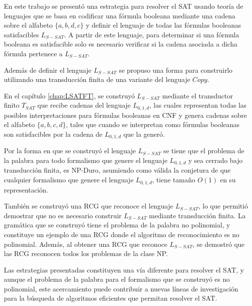 \begin{conclusionsAndRecomendations}

    En este trabajo se presentó una estrategia para resolver el SAT usando teoría de lenguajes que se basa en 
    codificar una fórmula booleana mediante una cadena sobre el alfabeto $\{a,b,d,c\}$ y definir el lenguaje de 
    todas las fórmulas booleanas satisfacibles $L_{S-SAT}$. A partir de este lenguaje, para determinar si una 
    fórmula booleana es satisfacible solo es necesario verificar si la cadena asociada a dicha fórmula pertenece 
    a $L_{S-SAT}$.
    
    Además de definir el lenguaje $L_{S-SAT}$ se propuso una forma para construirlo utilizando una transducción 
    finita de una variante del lenguaje $Copy$. 
    
    En el capítulo \ref{chap:LSATFT}, se construyó $L_{S-SAT}$ mediante el transductor finito $T_{SAT}$ que 
    recibe cadenas del lenguaje $L_{0,1,d}$, las cuales representan todas las posibles interpretaciones para 
    fórmulas booleanas en CNF y genera cadenas sobre el alfabeto $\{a,b,c,d\}$, tales que cuando se interpretan 
    como fórmulas booleanas son satisfacibles por la cadena de $L_{0,1,d}$ que la generó. 
    
    Por la forma en que se construyó el lenguaje $L_{S-SAT}$ se tiene que el problema de la palabra para todo 
    formalismo que genere el lenguaje $L_{0,1,d}$ y sea cerrado bajo transducción finita, es NP-Duro, asumiendo como válida 
    la conjetura de que cualquier formalismo que genere el lenguaje $L_{0,1,d}$, tiene tamaño $O(1)$ en su 
    representación.
    
    También se construyó una RCG que reconoce el lenguaje $L_{S-SAT}$, lo que permitió demostrar que no es 
    necesario construir $L_{S-SAT}$ mediante transducción finita. La gramática que se construyó tiene el 
    problema de la palabra no polinomial, y constituye un ejemplo de una RCG donde el algoritmo de reconocimiento 
    es no polinomial.  Además, al obtener una RCG que reconoce $L_{S-SAT}$, se demostró que las 
    RCG reconocen todos los problemas de la clase NP.
    
    Las estrategias presentadas constituyen una vía diferente para resolver el SAT, y aunque el problema de 
    la palabra para el formalismo que se construyó es no polinomial, este acercamiento puede contribuir a nuevas 
    líneas de investigación para la búsqueda de algoritmos eficientes que permitan resolver el SAT.
    

\end{conclusionsAndRecomendations}
